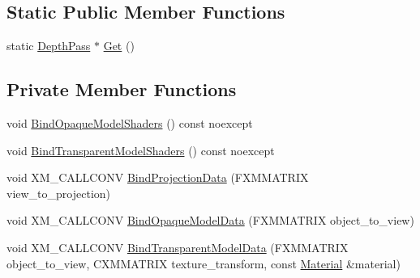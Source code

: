 \subsection*{Static Public Member Functions}
\begin{DoxyCompactItemize}
\item 
static \hyperlink{classmage_1_1_depth_pass}{Depth\+Pass} $\ast$ \hyperlink{classmage_1_1_depth_pass_a62a4f1dd404fdb43517d372537ea0e7f}{Get} ()
\end{DoxyCompactItemize}
\subsection*{Private Member Functions}
\begin{DoxyCompactItemize}
\item 
void \hyperlink{classmage_1_1_depth_pass_a6e10b136e64265fa36b9152353946bdc}{Bind\+Opaque\+Model\+Shaders} () const noexcept
\item 
void \hyperlink{classmage_1_1_depth_pass_af7765d2e9d94627671341d5d782b16d2}{Bind\+Transparent\+Model\+Shaders} () const noexcept
\item 
void X\+M\+\_\+\+C\+A\+L\+L\+C\+O\+NV \hyperlink{classmage_1_1_depth_pass_a9fa93bf5d67b9396d358e595be55a075}{Bind\+Projection\+Data} (F\+X\+M\+M\+A\+T\+R\+IX view\+\_\+to\+\_\+projection)
\item 
void X\+M\+\_\+\+C\+A\+L\+L\+C\+O\+NV \hyperlink{classmage_1_1_depth_pass_a674fc5fe2e8cae4c704a554dc8bc1fdd}{Bind\+Opaque\+Model\+Data} (F\+X\+M\+M\+A\+T\+R\+IX object\+\_\+to\+\_\+view)
\item 
void X\+M\+\_\+\+C\+A\+L\+L\+C\+O\+NV \hyperlink{classmage_1_1_depth_pass_a3f7dae474252b416ab6ec42daf3ad9f5}{Bind\+Transparent\+Model\+Data} (F\+X\+M\+M\+A\+T\+R\+IX object\+\_\+to\+\_\+view, C\+X\+M\+M\+A\+T\+R\+IX texture\+\_\+transform, const \hyperlink{classmage_1_1_material}{Material} \&material)
\end{DoxyCompactItemize}
